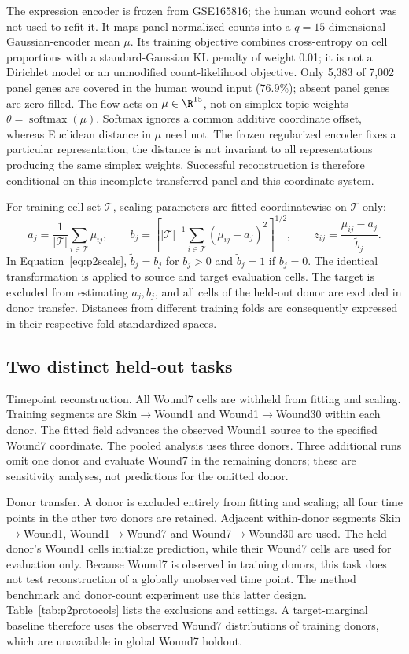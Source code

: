 The expression encoder is frozen from GSE165816; the human wound cohort was not used to refit it. It maps panel-normalized counts into a $q=15$ dimensional Gaussian-encoder mean $\mu$. Its training objective combines cross-entropy on cell proportions with a standard-Gaussian KL penalty of weight 0.01; it is not a Dirichlet model or an unmodified count-likelihood objective. Only 5,383 of 7,002 panel genes are covered in the human wound input (76.9\%); absent panel genes are zero-filled. The flow acts on $\mu\in\R^{15}$, not on simplex topic weights $\theta=\operatorname{softmax}(\mu)$. Softmax ignores a common additive coordinate offset, whereas Euclidean distance in $\mu$ need not. The frozen regularized encoder fixes a particular representation; the distance is not invariant to all representations producing the same simplex weights. Successful reconstruction is therefore conditional on this incomplete transferred panel and this coordinate system.

For training-cell set $\mathcal T$, scaling parameters are fitted coordinatewise on $\mathcal T$ only:
\begin{equation}
a_j=\frac1{|\mathcal T|}\sum_{i\in\mathcal T}\mu_{ij},\qquad
b_j=\left[|\mathcal T|^{-1}\sum_{i\in\mathcal T}(\mu_{ij}-a_j)^2\right]^{1/2},\qquad
z_{ij}=\frac{\mu_{ij}-a_j}{\widetilde b_j}.\label{eq:p2scale}
\end{equation}
In Equation~\eqref{eq:p2scale}, $\widetilde b_j=b_j$ for $b_j>0$ and $\widetilde b_j=1$ if $b_j=0$. The identical transformation is applied to source and target evaluation cells. The target is excluded from estimating $a_j,b_j$, and all cells of the held-out donor are excluded in donor transfer. Distances from different training folds are consequently expressed in their respective fold-standardized spaces.

\subsection{Two distinct held-out tasks}
Timepoint reconstruction. All Wound7 cells are withheld from fitting and scaling. Training segments are Skin$\rightarrow$Wound1 and Wound1$\rightarrow$Wound30 within each donor. The fitted field advances the observed Wound1 source to the specified Wound7 coordinate. The pooled analysis uses three donors. Three additional runs omit one donor and evaluate Wound7 in the remaining donors; these are sensitivity analyses, not predictions for the omitted donor.

Donor transfer. A donor is excluded entirely from fitting and scaling; all four time points in the other two donors are retained. Adjacent within-donor segments Skin$\rightarrow$Wound1, Wound1$\rightarrow$Wound7 and Wound7$\rightarrow$Wound30 are used. The held donor's Wound1 cells initialize prediction, while their Wound7 cells are used for evaluation only. Because Wound7 is observed in training donors, this task does not test reconstruction of a globally unobserved time point. The method benchmark and donor-count experiment use this latter design. Table~\ref{tab:p2protocols} lists the exclusions and settings. A target-marginal baseline therefore uses the observed Wound7 distributions of training donors, which are unavailable in global Wound7 holdout.


